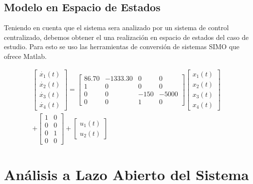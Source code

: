 \documentclass[journal,twoside,web]{ieeecolor}
\begin{document}
	\subsection{Modelo en Espacio de Estados}

Teniendo en cuenta que el sistema sera analizado por un sistema de control centralizado, debemos obtener el una realización en espacio de estados del caso de estudio. 
Para esto se uso las herramientas de conversión de sistemas SIMO que ofrece Matlab.

	\begin{equation}
		\begin{aligned}
			\begin{bmatrix}
				\dot{x_1}(t)  \\
				\dot{x_2}(t)  \\
				\dot{x_3}(t)  \\
				\dot{x_4}(t) 
			\end{bmatrix} = \begin{bmatrix}
								86.70 & -1333.30 & 0 & 0 \\
								1     & 0        & 0 & 0 \\
								0 & 0 & -150 & -5000 \\
								0 & 0 & 1 & 0 
							\end{bmatrix} \begin{bmatrix}
										x_1(t)  \\
										x_2(t)  \\
										x_3(t)  \\
										x_4(t) 
										\end{bmatrix} \\ + \begin{bmatrix}
												1 & 0 \\
												0 & 0 \\
												0 & 1 \\
												0 & 0
											\end{bmatrix}  + \begin{bmatrix}
																u_1(t) \\
																u_2(t)
															\end{bmatrix}
		\end{aligned}
	\end{equation}

	

\section{Análisis a Lazo Abierto del Sistema}
\end{document}

